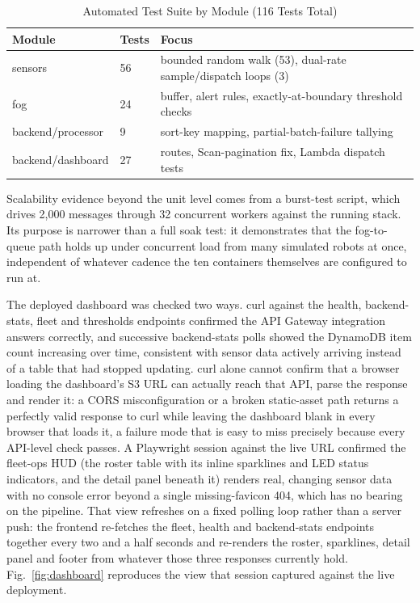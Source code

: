 \documentclass[conference]{IEEEtran}
\begin{document}
\begin{table}[!t]
\caption{Automated Test Suite by Module (116 Tests Total)}
\label{tab:tests}
\centering
\footnotesize
\begin{tabular}{|>{\raggedright\arraybackslash}p{1.75cm}|p{0.7cm}|>{\raggedright\arraybackslash}p{4.45cm}|}
\hline
\textbf{Module} & \textbf{Tests} & \textbf{Focus} \\
\hline
sensors & 56 & bounded random walk (53), dual-rate sample/dispatch loops (3) \\
\hline
fog & 24 & buffer, alert rules, exactly-at-boundary threshold checks \\
\hline
backend/processor & 9 & sort-key mapping, partial-batch-failure tallying \\
\hline
backend/dashboard & 27 & routes, Scan-pagination fix, Lambda dispatch tests \\
\hline
\end{tabular}
\end{table}

Scalability evidence beyond the unit level comes from a burst-test script, which drives 2,000 messages through 32 concurrent workers against the running stack. Its purpose is narrower than a full soak test: it demonstrates that the fog-to-queue path holds up under concurrent load from many simulated robots at once, independent of whatever cadence the ten containers themselves are configured to run at.

The deployed dashboard was checked two ways. curl against the health, backend-stats, fleet and thresholds endpoints confirmed the API Gateway integration answers correctly, and successive backend-stats polls showed the DynamoDB item count increasing over time, consistent with sensor data actively arriving instead of a table that had stopped updating. curl alone cannot confirm that a browser loading the dashboard's S3 URL can actually reach that API, parse the response and render it: a CORS misconfiguration or a broken static-asset path returns a perfectly valid response to curl while leaving the dashboard blank in every browser that loads it, a failure mode that is easy to miss precisely because every API-level check passes. A Playwright session against the live URL confirmed the fleet-ops HUD (the roster table with its inline sparklines and LED status indicators, and the detail panel beneath it) renders real, changing sensor data with no console error beyond a single missing-favicon 404, which has no bearing on the pipeline. That view refreshes on a fixed polling loop rather than a server push: the frontend re-fetches the fleet, health and backend-stats endpoints together every two and a half seconds and re-renders the roster, sparklines, detail panel and footer from whatever those three responses currently hold. Fig.~\ref{fig:dashboard} reproduces the view that session captured against the live deployment.
\end{document}
